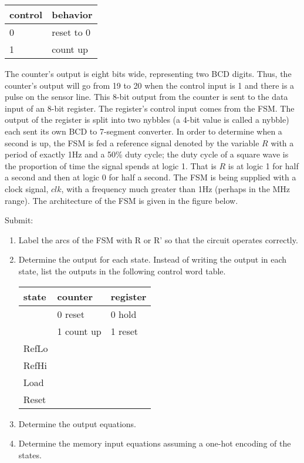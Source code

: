 \begin{enumerate}
\begin{tabular}{l|l}
control & behavior \\ \hline \hline
0	& reset to 0 \\ \hline
1	& count up \\
\end{tabular}

The counter's output is eight bits wide, representing two BCD digits.  Thus,
the counter's output will go from 19 to 20 when the control input is 1
and there is a pulse on the sensor line.  This 8-bit output from the
counter is sent to the data input of an 8-bit register.  The register's
control input comes from the FSM.  The output of the register is split
into two nybbles (a 4-bit value is called a nybble)
each sent its own BCD to 7-segment converter.  In order to determine
when a second is up, the FSM is fed a reference signal denoted by 
the variable $R$ with a period of exactly 1Hz and a 50\% duty cycle; 
the duty cycle of a square wave is the proportion of time the signal 
spends at logic 1.   That is $R$ is at logic 1 for half a second and 
then at logic 0 for half a second.  The FSM is being supplied with a 
clock signal, $clk$, with a frequency much greater than 1Hz (perhaps 
in the MHz range).  The architecture of the FSM is given in 
the figure below.  


Submit:
\begin{enumerate}
\item Label the arcs of the FSM with R or R' so that the
 circuit operates correctly.
\item Determine the output for each state.  Instead of writing the
output in each state, list the outputs in the following control
word table.

\begin{tabular}{l||l|l}
state	& counter	& register \\ \hline 
	& 0 reset	& 0 hold \\ \hline
	& 1 count up& 1 reset \\ \hline \hline
RefLo	&		&	  \\ \hline
RefHi	&		&	  \\ \hline
Load 	&		&	  \\ \hline
Reset	&		&	  \\ 
\end{tabular}

\item Determine the output equations.
\item Determine the memory input equations assuming a one-hot
encoding of the states.
\end{enumerate}



\end{enumerate}
